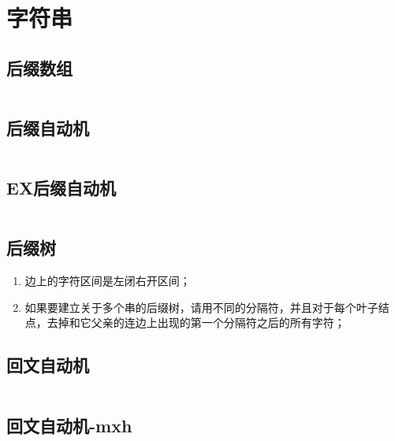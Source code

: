 \chapter{字符串}
\section{后缀数组}
\inputminted{cpp}{\source/string/suffix-array.cpp}
\section{后缀自动机}
\inputminted{cpp}{\source/string/suffix-automaton.cpp}
\section{EX后缀自动机}
\inputminted{cpp}{\source/string/ex-suffix-automaton.cpp}
\section{后缀树}
\begin{enumerate}
	\item 边上的字符区间是左闭右开区间；
	\item 如果要建立关于多个串的后缀树，请用不同的分隔符，并且对于每个叶子结点，去掉和它父亲的连边上出现的第一个分隔符之后的所有字符；
\end{enumerate}
\section{回文自动机}
\inputminted{cpp}{\source/string/palindromic-tree.cpp}
\section{回文自动机-mxh}
\inputminted{cpp}{\source/string/pam.cpp}
